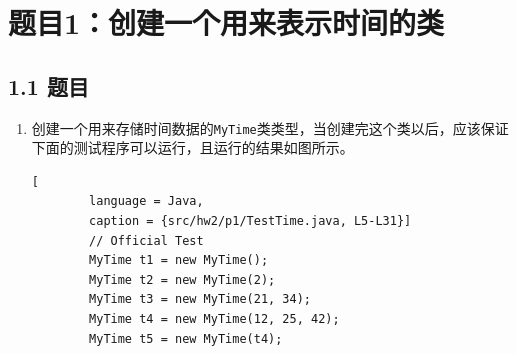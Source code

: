 \vspace{-3cm}\chapter{题目1：创建一个用来表示时间的类}

\section{1.1 题目}
\begin{enumerate}
    \item 创建一个用来存储时间数据的\lstinline{MyTime}类类型，当创建完这个类以后，应该保证下面的测试程序可以运行，且运行的结果如图所示。
    \begin{lstlisting}[
        language = Java,
        caption = {src/hw2/p1/TestTime.java, L5-L31}]
        // Official Test
        MyTime t1 = new MyTime();
        MyTime t2 = new MyTime(2);
        MyTime t3 = new MyTime(21, 34);
        MyTime t4 = new MyTime(12, 25, 42);
        MyTime t5 = new MyTime(t4);


\end{lstlisting}
\end{enumerate}
